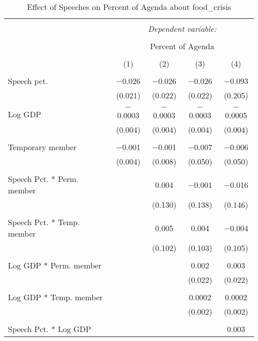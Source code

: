 
\begin{table}[!htbp] \centering 
  \caption{Effect of Speeches on Percent of Agenda about  food_crisis} 
  \label{} 
\begin{tabular}{@{\extracolsep{5pt}}lcccc} 
\\[-1.8ex]\hline 
\hline \\[-1.8ex] 
 & \multicolumn{4}{c}{\textit{Dependent variable:}} \\ 
\cline{2-5} 
\\[-1.8ex] & \multicolumn{4}{c}{Percent of Agenda} \\ 
\\[-1.8ex] & (1) & (2) & (3) & (4)\\ 
\hline \\[-1.8ex] 
 Speech pct. & $-$0.026 & $-$0.026 & $-$0.026 & $-$0.093 \\ 
  & (0.021) & (0.022) & (0.022) & (0.205) \\ 
  & & & & \\ 
 Log GDP & $-$0.0003 & $-$0.0003 & $-$0.0003 & $-$0.0005 \\ 
  & (0.004) & (0.004) & (0.004) & (0.004) \\ 
  & & & & \\ 
 Temporary member & $-$0.001 & $-$0.001 & $-$0.007 & $-$0.006 \\ 
  & (0.004) & (0.008) & (0.050) & (0.050) \\ 
  & & & & \\ 
 Speech Pct. * Perm. member &  & 0.004 & $-$0.001 & $-$0.016 \\ 
  &  & (0.130) & (0.138) & (0.146) \\ 
  & & & & \\ 
 Speech Pct. * Temp. member &  & 0.005 & 0.004 & $-$0.004 \\ 
  &  & (0.102) & (0.103) & (0.105) \\ 
  & & & & \\ 
 Log GDP * Perm. member &  &  & 0.002 & 0.003 \\ 
  &  &  & (0.022) & (0.022) \\ 
  & & & & \\ 
 Log GDP * Temp. member &  &  & 0.0002 & 0.0002 \\ 
  &  &  & (0.002) & (0.002) \\ 
  & & & & \\ 
 Speech Pct. * Log GDP &  &  &  & 0.003 \\ 

\end{tabular}
\end{table}
